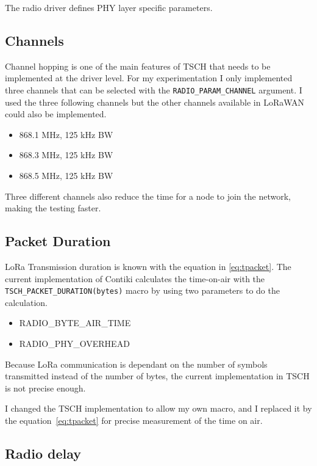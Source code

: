 The radio driver defines PHY layer specific parameters.

\subsection{Channels}

Channel hopping is one of the main features of TSCH that needs to be implemented
at the driver level.
For my experimentation I only implemented three channels that can be selected
with the \lstinline{RADIO_PARAM_CHANNEL} argument.
I used the three following channels but the other channels available in LoRaWAN
could also be implemented.

\begin{itemize}
  \item 868.1 MHz, 125 kHz BW
  \item 868.3 MHz, 125 kHz BW
  \item 868.5 MHz, 125 kHz BW
\end{itemize}

Three different channels also reduce the time for a node to join the network,
making the testing faster.

\subsection{Packet Duration\label{section:transmissiontime}}

LoRa Transmission duration is known with the equation in \ref{eq:tpacket}.
The current implementation of Contiki calculates the time-on-air with the
\lstinline{TSCH_PACKET_DURATION(bytes)} macro by using two parameters to do the
calculation.

\begin{itemize}
  \item RADIO\_BYTE\_AIR\_TIME
  \item RADIO\_PHY\_OVERHEAD
\end{itemize}

Because LoRa communication is dependant on the number of symbols transmitted
instead of the number of bytes, the current implementation in TSCH is not
precise enough.

I changed the TSCH implementation to allow my own macro, and
I replaced it by the equation~\ref{eq:tpacket} for precise measurement
of the time on air.

\subsection{Radio delay}

